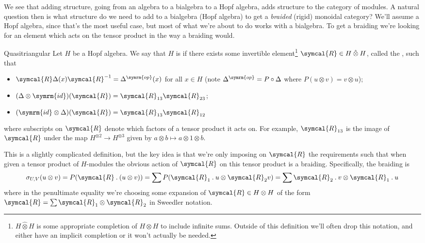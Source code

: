 \documentclass[fleqn]{NotesClass}
\newcommand{\id}{\symrm{id}}
\newcommand{\action}{\mathbin{.}}
\newcommand{\op}{\symrm{op}}
\newcommand{\universalRmatrix}{\symcal{R}}
\begin{document}
    We see that adding structure, going from an algebra to a bialgebra to a Hopf algebra, adds structure to the category of modules.
    A natural question then is what structure do we need to add to a bialgebra (Hopf algebra) to get a \emph{braided} (rigid) monoidal category?
    We'll assume a Hopf algebra, since that's the most useful case, but most of what we're about to do works with a bialgebra.
    To get a braiding we're looking for an element which acts on the tensor product in the way a braiding would.
    
    \begin{dfn}{Quasitriangular}{}
        Let \(H\) be a Hopf algebra.
        We say that \(H\) is  if there exists some invertible element\footnote{\(H \mathbin{\hat{\otimes}} H\) is some appropriate completion of \(H \otimes H\) to include infinite sums. Outside of this definition we'll often drop this notation, and either have an implicit completion or it won't actually be needed.} \(\universalRmatrix \in H \mathbin{\hat{\otimes}} H\), called the , such that
        \begin{itemize}
            \item \(\universalRmatrix \Delta(x) \universalRmatrix^{-1} = \Delta^{\op}(x)\) for all \(x \in H\) (note \(\Delta^{\op} = P \circ \Delta\) where \(P(u \otimes v) = v \otimes u\));
            \item \((\Delta \otimes \id)(\universalRmatrix) = \universalRmatrix_{13}\universalRmatrix_{23}\);
            \item \((\id \otimes \Delta)(\universalRmatrix) = \universalRmatrix_{13}\universalRmatrix_{12}\)
        \end{itemize}
        where subscripts on \(\universalRmatrix\) denote which factors of a tensor product it acts on.
        For example, \(\universalRmatrix_{13}\) is the image of \(\universalRmatrix\) under the map \(H^{\otimes 2} \to H^{\otimes 3}\) given by \(a \otimes b \mapsto a \otimes 1 \otimes b\).
    \end{dfn}
    
    This is a slightly complicated definition, but the key idea is that we're only imposing on \(\universalRmatrix\) the requirements such that when given a tensor product of \(H\)-modules the obvious action of \(\universalRmatrix\) on this tensor product is a braiding.
    Specifically, the braiding is
    \begin{equation}
        \sigma_{U,V}(u \otimes v) = P(\universalRmatrix \action (u \otimes v)) = \sum P(\universalRmatrix_{1} \action u \otimes \universalRmatrix_{2} v) = \sum \universalRmatrix_2 \action v \otimes \universalRmatrix_1 \action u
    \end{equation}
    where in the penultimate equality we're choosing some expansion of \(\universalRmatrix \in H \otimes H\) of the form \(\universalRmatrix = \sum \universalRmatrix_1 \otimes \universalRmatrix_2\) in Sweedler notation.
    
\end{document}
